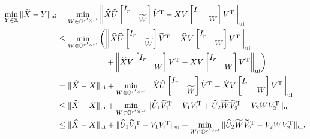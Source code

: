 \documentclass[11pt]{article}
\def\bbO{\mathbb{O}}
\def\bbX{\mathbb{X}}
\DeclareMathOperator{\T}{T}
\DeclareMathOperator{\UI}{ui}
\def\wtd{\widetilde}
\def\what{\widehat}
\theoremstyle{definition}
\numberwithin{equation}{section}
\numberwithin{figure}{section}
\numberwithin{table}{section}
\begin{document}
\begin{align}
\min_{Y\in\bbX}\|\wtd X-Y\|_{\UI}
    &=\min_{W\in\bbO^{r'\times r'}}
        \left\|\what X\what U\begin{bmatrix}
                     I_r &  \\
                      & \wtd W
                   \end{bmatrix}\wtd V^{\T}- XV\begin{bmatrix}
                     I_r &  \\
                      & W
                   \end{bmatrix}V^{\T}\right\|_{\UI} \notag\\
  &\le\min_{W\in\bbO^{r'\times r'}}\left(\left\|\what X\what U\begin{bmatrix}
                     I_r &  \\
                      & \wtd W
                   \end{bmatrix}\wtd V^{\T}- \what XV\begin{bmatrix}
                     I_r &  \\
                      & W
                   \end{bmatrix}V^{\T}\right\|_{\UI}\right. \notag \\
  &\qquad\qquad\qquad \left.+\left\|\what XV\begin{bmatrix}
                     I_r &  \\
                      & W
                   \end{bmatrix}V^{\T}- XV\begin{bmatrix}
                     I_r &  \\
                      & W
                   \end{bmatrix}V^{\T}\right\|_{\UI}\right)  \notag\\
  &=\|\what X- X\|_{\UI}+\min_{W\in\bbO^{r'\times r'}}\left\|\what X\what U\begin{bmatrix}
                     I_r &  \\
                      & \wtd W
                   \end{bmatrix}\wtd V^{\T}- \what XV\begin{bmatrix}
                     I_r &  \\
                      & W
                   \end{bmatrix}V^{\T}\right\|_{\UI}  \notag\\
  &\le\|\what X- X\|_{\UI}+\min_{W\in\bbO^{r'\times r'}}\|\what U_1\wtd V_1^{\T}-V_1V_1^{\T}
        +\what U_2 \wtd W\wtd V_2^{\T}-V_2WV_2^{\T}\|_{\UI}\notag \\
  &\le\|\what X- X\|_{\UI}+\|\what U_1\wtd V_1^{\T}-V_1V_1^{\T}\|_{\UI}
      +\min_{W\in\bbO^{r'\times r'}}\|\what U_2\wtd W\wtd V_2^{\T}- V_2WV_2^{\T}\|_{\UI}.
         \label{eq:dist-all}
\end{align}
\end{document}
